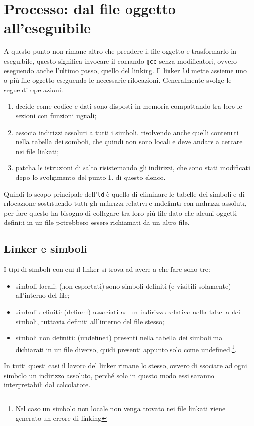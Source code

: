 \documentclass[class=book, crop=false, oneside]{standalone}
\begin{document}
\section{Processo: dal file oggetto all'eseguibile}
A questo punto non rimane altro che prendere il file oggetto e trasformarlo in eseguibile, questo significa invocare il comando \texttt{gcc} senza modificatori, ovvero eseguendo anche l'ultimo passo, quello del linking.
Il linker \texttt{ld} mette assieme uno o più file oggetto eseguendo le necessarie rilocazioni. Generalmente svolge le seguenti operazioni:
\begin{enumerate}
	\item decide come codice e dati sono disposti in memoria compattando tra loro le sezioni con funzioni uguali;
	\item associa indirizzi assoluti a tutti i simboli, risolvendo anche quelli contenuti nella tabella dei somboli, che quindi non sono locali e deve andare a cercare nei file  linkati;
	\item patcha le istruzioni di salto risistemando gli indirizzi, che sono stati modificati dopo lo svolgimento del punto 1. di questo elenco.
\end{enumerate}
Quindi lo scopo principale dell'\texttt{ld} è quello di eliminare le tabelle dei simboli e di rilocazione sostituendo tutti gli indirizzi relativi e indefiniti con indirizzi assoluti, per fare questo ha bisogno di collegare tra loro più file  dato che alcuni oggetti definiti in un file potrebbero essere richiamati da un altro file.

\subsection{Linker e simboli}
I tipi di simboli con cui il linker si trova ad avere a che fare sono tre:
\begin{itemize}
	\item simboli locali: (non esportati) sono simboli definiti (e visibili solamente) all'interno del file;
	\item simboli definiti: (defined) associati ad un indirizzo relativo nella tabella dei simboli, tuttavia definiti all'interno del file stesso;
	\item simboli non definiti: (undefined) presenti nella tabella dei simboli ma dichiarati in un file diverso, quidi presenti appunto solo come undefined.\footnote{Nel caso un simbolo non locale non venga trovato nei file  linkati viene generato un errore di linking}.
\end{itemize}
In tutti questi casi il lavoro del linker rimane lo stesso, ovvero di ssociare ad ogni simbolo un indirizzo assoluto, perché solo in questo modo essi saranno interpretabili dal calcolatore.
\end{document}
